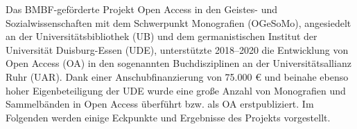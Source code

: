 Das BMBF-geförderte Projekt Open Access in den Geistes- und
Sozialwissenschaften mit dem Schwerpunkt Monografien (OGeSoMo),
angesiedelt an der Universitätsbibliothek (UB) und dem germanistischen
Institut der Universität Duisburg-Essen (UDE), unterstützte 2018--2020
die Entwicklung von Open Access (OA) in den sogenannten Buchdisziplinen
an der Universitätsallianz Ruhr (UAR). Dank einer Anschubfinanzierung
von 75.000 € und beinahe ebenso hoher Eigenbeteiligung der UDE wurde
eine große Anzahl von Monografien und Sammelbänden in Open Access
überführt bzw. als OA erstpubliziert. Im Folgenden werden einige
Eckpunkte und Ergebnisse des Projekts vorgestellt.
